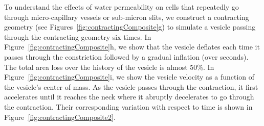 \documentclass[9pt,twocolumn,twoside,lineno]{pnas-new}
\begin{document}
To understand the effects of water permeability on cells that repeatedly go through micro-capillary vessels or sub-micron slits, 
we construct a contracting geometry (see Figures~\ref{fig:contractingComposite}g)
to simulate a vesicle passing through the contracting geometry six times.
In Figure~\ref{fig:contractingComposite}h, we show that the vesicle
deflates each time it passes through the constriction followed by a
gradual inflation (over seconds). The total area loss over the history of the vesicle is
almost 50\%. In Figure~\ref{fig:contractingComposite}i, we show the
vesicle velocity as a function of the vesicle's center of mass. As the
vesicle passes through the contraction, it first accelerates until it reaches the neck where it abruptly decelerates
to go through the contraction. Their corresponding variation with respect to time is shown in Figure~\ref{fig:contractingComposite2}.

%
\end{document}
